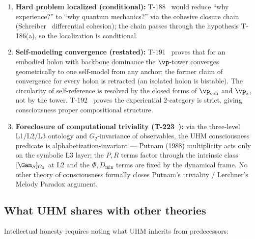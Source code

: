 \begin{enumerate}[leftmargin=2em]
        therefore :
        the former claim of full self-grounding with zero independent axioms
        is retracted \status{$\times$} --- the constraint $\hat C\Gam = 0$ of A5
        remains an independent axiom, and the free parameters of the
        potential (among them the associator coupling $\kappa$, T-331) are free.
  \item \textbf{Hard problem localized (conditional):} T-188~
        would reduce ``why experience?'' to ``why quantum mechanics?'' via the
        cohesive closure chain (Schreiber~\cite{schreiber2013} differential
        cohesion); the chain passes through the hypothesis T-186(a), so the
        localization is conditional.
  \item \textbf{Self-modeling convergence (restated):} T-191~ proves
        that for an embodied holon with backbone dominance the $\vp$-tower converges
        geometrically to one self-model from any anchor; the former claim of
        convergence for every holon is retracted \status{$\times$} (an isolated
        holon is bistable). The circularity of self-reference is resolved by the
        closed forms of $\vp_{\mathrm{coh}}$ and $\vp_s$, not by the tower.
        T-192~ proves the experiential 2-category is strict, giving
        consciousness proper compositional structure.
  \item \textbf{Foreclosure of computational triviality (T-223~):} via the
        three-level L1/L2/L3 ontology and $G_2$-invariance of observables, the UHM
        consciousness predicate is alphabetization-invariant --- Putnam (1988)
        multiplicity acts only on the symbolic L3 layer; the $P, R$ terms factor
        through the intrinsic class $[\Gam_S]_{G_2}$ at L2 and the $\Phi, D_{\min}$
        terms are fixed by the dynamical frame. No other theory of consciousness
        formally closes Putnam's triviality / Lerchner's Melody Paradox argument.
\end{enumerate}

\subsection{What UHM shares with other theories}

Intellectual honesty requires noting what UHM inherits from predecessors:

